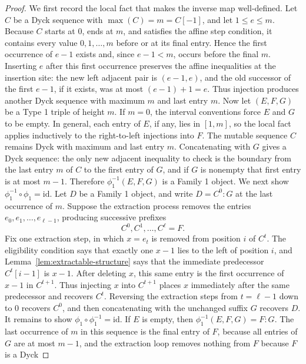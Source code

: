 \documentclass[11pt]{article}
\theoremstyle{plain}
\theoremstyle{definition}
\theoremstyle{remark}
\begin{document}
\begin{proof}
We first record the local fact that makes the inverse map well-defined.  Let
\(C\) be a Dyck sequence with \(\max(C)=m=C[-1]\), and let \(1\le e\le m\).
Because \(C\) starts at \(0\), ends at \(m\), and satisfies the affine step
condition, it contains every value \(0,1,\ldots,m\) before or at its final
entry.  Hence the first occurrence of \(e-1\) exists and, since \(e-1<m\),
occurs before the final \(m\).  Inserting \(e\) after this first occurrence
preserves the affine inequalities at the insertion site: the new left adjacent
pair is \((e-1,e)\), and the old successor of the first \(e-1\), if it exists,
was at most \((e-1)+1=e\).  Thus injection produces another Dyck sequence with
maximum \(m\) and last entry \(m\).
Now let \((E,F,G)\) be a Type 1 triple of height \(m\).  If \(m=0\), the
interval conventions force \(E\) and \(G\) to be empty.  In general, each entry
of \(E\), if any, lies in \([1,m]\), so the local fact applies inductively to
the right-to-left injections into \(F\).  The mutable sequence \(C\) remains
Dyck with maximum and last entry \(m\).  Concatenating with \(G\) gives a Dyck
sequence: the only new adjacent inequality to check is the boundary from the
last entry \(m\) of \(C\) to the first entry of \(G\), and if \(G\) is nonempty
that first entry is at most \(m-1\).  Therefore \(\phi_1^{-1}(E,F,G)\) is a
Family 1 object.
We next show \(\phi_1^{-1}\circ\phi_1=\mathrm{id}\).  Let \(D\) be a Family 1
object, and write \(D=C^0:G\) at the last occurrence of \(m\).  Suppose the
extraction process removes the entries \(e_0,e_1,\ldots,e_{\ell-1}\), producing
successive prefixes
\[
  C^0,C^1,\ldots,C^\ell=F.
\]
Fix one extraction step, in which \(x=e_t\) is removed from position \(i\) of
\(C^t\).  The eligibility condition says that exactly one \(x-1\) lies to the
left of position \(i\), and Lemma~\ref{lem:extractable-structure} says that the
immediate predecessor \(C^t[i-1]\) is \(x-1\).  After deleting \(x\), this same
entry is the first occurrence of \(x-1\) in \(C^{t+1}\).  Thus injecting \(x\)
into \(C^{t+1}\) places \(x\) immediately after the same predecessor and
recovers \(C^t\).  Reversing the extraction steps from \(t=\ell-1\) down to
\(0\) recovers \(C^0\), and then concatenating with the unchanged suffix \(G\)
recovers \(D\).
It remains to show \(\phi_1\circ\phi_1^{-1}=\mathrm{id}\).  If \(E\) is empty,
then \(\phi_1^{-1}(E,F,G)=F:G\).  The last occurrence of \(m\) in this sequence
is the final entry of \(F\), because all entries of \(G\) are at most \(m-1\),
and the extraction loop removes nothing from \(F\) because \(F\) is a Dyck

\end{proof}
\end{document}
